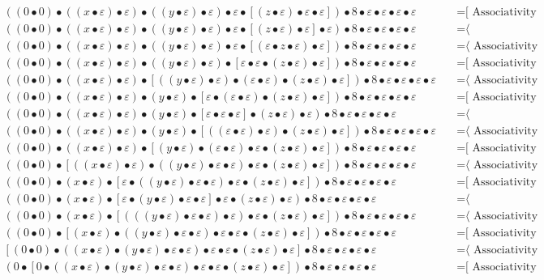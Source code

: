 \documentclass{article}
\begin{document}
\begin{align*}
((0 • 0) • ((x • ε) • ε) • ((y • ε) • ε) • ε • [(z • ε) • ε • ε]) • 8 • ε • ε • ε • ε
  & \quad \text{=[ Associativity ⟩}\\
((0 • 0) • ((x • ε) • ε) • ((y • ε) • ε) • ε • [(z • ε) • ε] • ε) • 8 • ε • ε • ε • ε
  & \quad \text{=⟨ Commutativity ]}\\
((0 • 0) • ((x • ε) • ε) • ((y • ε) • ε) • ε • [(ε • z • ε) • ε]) • 8 • ε • ε • ε • ε
  & \quad \text{=⟨ Associativity ]}\\
((0 • 0) • ((x • ε) • ε) • ((y • ε) • ε) • [ε • ε • (z • ε) • ε]) • 8 • ε • ε • ε • ε
  & \quad \text{=[ Associativity ⟩}\\
((0 • 0) • ((x • ε) • ε) • [((y • ε) • ε) • (ε • ε) • (z • ε) • ε]) • 8 • ε • ε • ε • ε
  & \quad \text{=⟨ Associativity ]}\\
((0 • 0) • ((x • ε) • ε) • (y • ε) • [ε • (ε • ε) • (z • ε) • ε]) • 8 • ε • ε • ε • ε
  & \quad \text{=[ Associativity ⟩}\\
((0 • 0) • ((x • ε) • ε) • (y • ε) • [ε • ε • ε] • (z • ε) • ε) • 8 • ε • ε • ε • ε
  & \quad \text{=⟨ Commutativity ]}\\
((0 • 0) • ((x • ε) • ε) • (y • ε) • [((ε • ε) • ε) • (z • ε) • ε]) • 8 • ε • ε • ε • ε
  & \quad \text{=⟨ Associativity ]}\\
((0 • 0) • ((x • ε) • ε) • [(y • ε) • (ε • ε) • ε • (z • ε) • ε]) • 8 • ε • ε • ε • ε
  & \quad \text{=[ Associativity ⟩}\\
((0 • 0) • [((x • ε) • ε) • ((y • ε) • ε • ε) • ε • (z • ε) • ε]) • 8 • ε • ε • ε • ε
  & \quad \text{=⟨ Associativity ]}\\
((0 • 0) • (x • ε) • [ε • ((y • ε) • ε • ε) • ε • (z • ε) • ε]) • 8 • ε • ε • ε • ε
  & \quad \text{=[ Associativity ⟩}\\
((0 • 0) • (x • ε) • [ε • (y • ε) • ε • ε] • ε • (z • ε) • ε) • 8 • ε • ε • ε • ε
  & \quad \text{=⟨ Commutativity ]}\\
((0 • 0) • (x • ε) • [(((y • ε) • ε • ε) • ε) • ε • (z • ε) • ε]) • 8 • ε • ε • ε • ε
  & \quad \text{=⟨ Associativity ]}\\
((0 • 0) • [(x • ε) • ((y • ε) • ε • ε) • ε • ε • (z • ε) • ε]) • 8 • ε • ε • ε • ε
  & \quad \text{=[ Associativity ⟩}\\
[(0 • 0) • ((x • ε) • (y • ε) • ε • ε) • ε • ε • (z • ε) • ε] • 8 • ε • ε • ε • ε
  & \quad \text{=⟨ Associativity ]}\\
(0 • [0 • ((x • ε) • (y • ε) • ε • ε) • ε • ε • (z • ε) • ε]) • 8 • ε • ε • ε • ε
  & \quad \text{=[ Associativity ⟩}\\

\end{align*}
\end{document}
